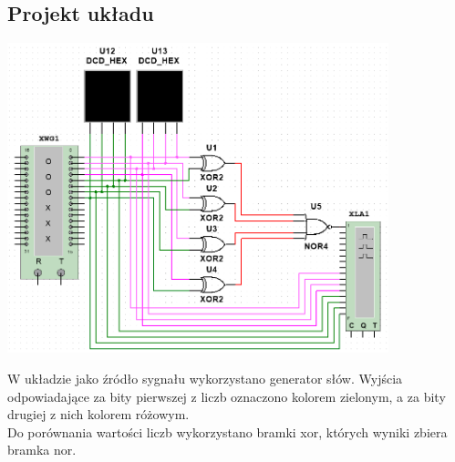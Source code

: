 \documentclass{article}
\begin{document}
        \subsection{Projekt układu}
            \begin{center}
                \includegraphics[height=9cm]{reports/img/Z1B_1.png}\\
            \end{center}
            W układzie jako źródło sygnału wykorzystano generator słów. Wyjścia odpowiadające za bity pierwszej z liczb oznaczono kolorem zielonym, a za bity drugiej z nich kolorem różowym. \\
            Do porównania wartości liczb wykorzystano bramki xor, których wyniki zbiera bramka nor. \\
            \FloatBarrier
            
\end{document}

